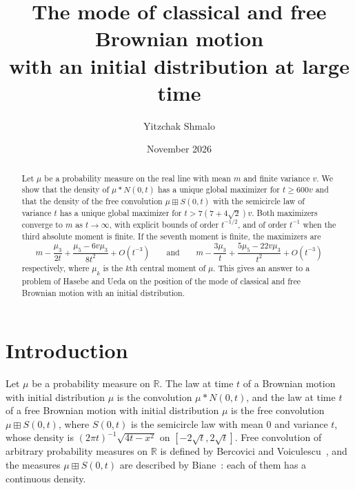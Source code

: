 \documentclass[11pt]{amsart}
\title[The mode of classical and free Brownian motion]{The mode of classical and free Brownian motion\\
with an initial distribution at large time}
\author{Yitzchak Shmalo}
\date{November 2026}
\theoremstyle{definition}
\newcommand{\R}{\mathbb{R}}
\begin{document}
\begin{abstract}
Let $\mu$ be a probability measure on the real line with mean $m$ and finite variance $v$. We show that the density
of $\mu*N(0,t)$ has a unique global maximizer for $t\ge 600v$ and that the density of the free convolution
$\mu\boxplus S(0,t)$ with the semicircle law of variance $t$ has a unique global maximizer for
$t>7(7+4\sqrt2)v$. Both maximizers converge to $m$ as $t\to\infty$, with explicit bounds of order $t^{-1/2}$, and of
order $t^{-1}$ when the third absolute moment is finite. If the seventh moment is finite, the maximizers are
\[
m-\frac{\mu_3}{2t}+\frac{\mu_5-6v\mu_3}{8t^2}+O(t^{-3})\qquad\text{and}\qquad
m-\frac{3\mu_3}{t}+\frac{5\mu_5-22v\mu_3}{t^2}+O(t^{-3})
\]
respectively, where $\mu_k$ is the $k$th central moment of $\mu$. This gives an answer to a problem of Hasebe and
Ueda on the position of the mode of classical and free Brownian motion with an initial distribution.
\end{abstract}
\maketitle

\section{Introduction}

Let $\mu$ be a probability measure on $\R$. The law at time $t$ of a Brownian motion with initial distribution $\mu$
is the convolution $\mu*N(0,t)$, and the law at time $t$ of a free Brownian motion with initial distribution $\mu$
is the free convolution $\mu\boxplus S(0,t)$, where $S(0,t)$ is the semicircle law with mean $0$ and variance $t$,
whose density is $(2\pi t)^{-1}\sqrt{4t-x^2}$ on $[-2\sqrt t,2\sqrt t]$. Free convolution of arbitrary probability
measures on $\R$ is defined by Bercovici and Voiculescu~\cite{BV}, and the measures $\mu\boxplus S(0,t)$ are
described by Biane~\cite{Biane}: each of them has a continuous density.
\end{document}
